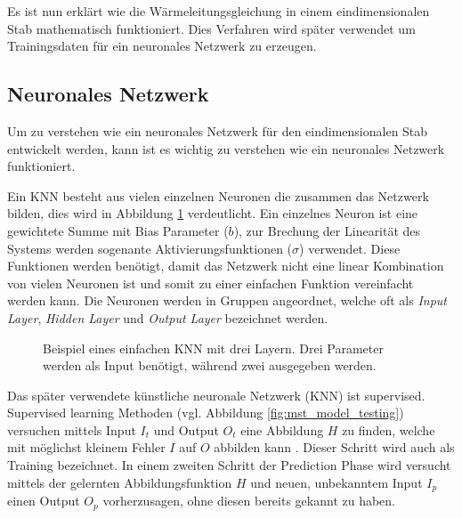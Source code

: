 Es ist nun erklärt wie die Wärmeleitungsgleichung in einem eindimensionalen Stab mathematisch funktioniert. Dies Verfahren wird später verwendet um Trainingsdaten für ein neuronales Netzwerk zu erzeugen.


\subsection{Neuronales Netzwerk}

Um zu verstehen wie ein neuronales Netzwerk für den eindimensionalen Stab entwickelt werden, kann ist es wichtig zu verstehen wie ein neuronales Netzwerk funktioniert.

Ein KNN besteht aus vielen einzelnen Neuronen die zusammen das Netzwerk bilden, dies wird in Abbildung \ref{fig:mst_neuronalnetwork} verdeutlicht. Ein einzelnes Neuron ist eine gewichtete Summe mit Bias Parameter ($b$), zur Brechung der Linearität des Systems werden sogenante Aktivierungsfunktionen ($\sigma$) verwendet. Diese Funktionen werden benötigt, damit das Netzwerk nicht eine linear Kombination von vielen Neuronen ist und somit zu einer einfachen Funktion vereinfacht werden kann. Die Neuronen werden in Gruppen angeordnet, welche oft als \textit{Input Layer}, \textit{Hidden Layer} und \textit{Output Layer} bezeichnet werden. 

\begin{figure}
	\centering
	
	\label{fig:mst_neuronalnetwork}
	\caption{Beispiel eines einfachen KNN mit drei Layern. Drei Parameter werden als Input benötigt, während zwei ausgegeben werden.}
\end{figure}

Das später verwendete künstliche neuronale Netzwerk (KNN) ist supervised. Supervised learning Methoden (vgl. Abbildung \ref{fig:mst_model_testing}) versuchen mittels Input $I_{t}$ und Output $O_{t}$ eine Abbildung $H$ zu finden, welche mit möglichst kleinem Fehler $I$ auf $O$ abbilden kann \cite{moohri:2012}. Dieser Schritt wird auch als Training bezeichnet. In einem zweiten Schritt der Prediction Phase wird versucht mittels der gelernten Abbildungsfunktion $H$ und neuen, unbekanntem Input $I_{p}$ einen Output $O_{p}$ vorherzusagen, ohne diesen bereits gekannt zu haben.

